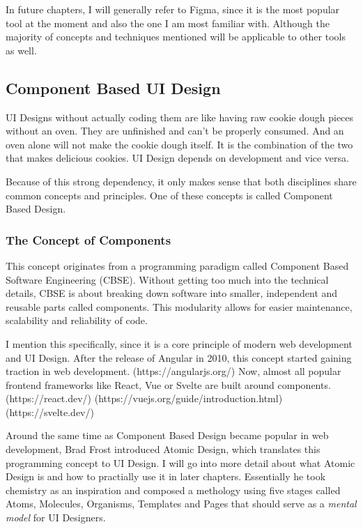 In future chapters, I will generally refer to Figma, since it is the most popular tool at the moment
and also the one I am most familiar with. Although the majority of concepts and techniques mentioned
will be applicable to other tools as well.

\subsection{Component Based UI Design}
UI Designs without actually coding them are like having raw cookie dough pieces without an oven.
They are unfinished and can't be properly consumed. And an oven alone will not make the cookie dough
itself. It is the combination of the two that makes delicious cookies. UI Design depends on
development and vice versa.

Because of this strong dependency, it only makes sense that both disciplines share common concepts
and principles. One of these concepts is called Component Based Design.

\subsubsection{The Concept of Components}
This concept originates from a programming paradigm called Component Based Software Engineering
(CBSE). Without getting too much into the technical details, CBSE is about breaking down software
into smaller, independent and reusable parts called components. This modularity allows for easier
maintenance, scalability and reliability of code.

I mention this specifically, since it is a core principle of modern web development and UI Design.
After the release of Angular in 2010, this concept started gaining traction in web development.
(https://angularjs.org/)
Now, almost all popular frontend frameworks like React, Vue or Svelte are built around components.
(https://react.dev/) (https://vuejs.org/guide/introduction.html) (https://svelte.dev/)

Around the same time as Component Based Design became popular in web development, Brad Frost
introduced Atomic Design, which translates this programming concept to UI Design. I will go into
more detail about what Atomic Design is and how to practially use it in later chapters. Essentially
he took chemistry as an inspiration and composed a methology using five stages called Atoms,
Molecules, Organisms, Templates and Pages that should serve as a \textit{mental model} for UI
Designers. 

